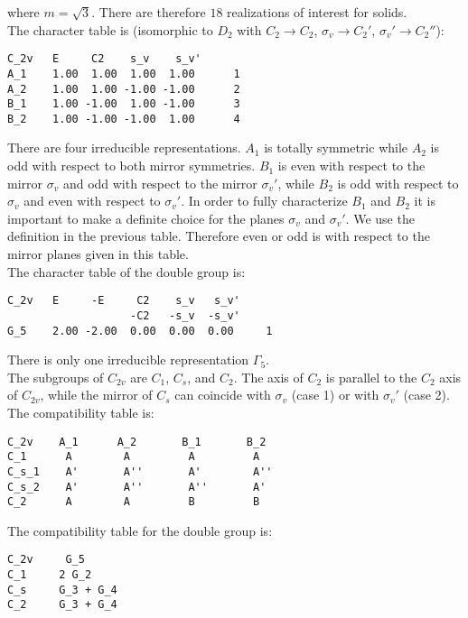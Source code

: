 \documentclass[12pt,a4paper]{article}
\begin{document}
where $m=\sqrt{3}$.
There are therefore $18$ realizations of interest for solids. \\
The character table is (isomorphic to $D_2$ with $C_2 \rightarrow C_2$,
$\sigma_v \rightarrow C_2'$, $\sigma_v' \rightarrow C_2''$):
\begin{verbatim}
C_2v   E     C2    s_v    s_v'
A_1    1.00  1.00  1.00  1.00      1
A_2    1.00  1.00 -1.00 -1.00      2
B_1    1.00 -1.00  1.00 -1.00      3
B_2    1.00 -1.00 -1.00  1.00      4
\end{verbatim}
There are four irreducible representations. $A_1$ is totally symmetric while
$A_2$ is odd with respect to both mirror symmetries.  
$B_1$ is even with respect to the mirror $\sigma_v$ and odd with respect to
the mirror $\sigma_v'$, while $B_2$ is odd with respect to $\sigma_v$ and even 
with respect to $\sigma_v'$. In order to fully characterize $B_1$ and $B_2$
it is important to make a definite choice for the planes $\sigma_v$ and $\sigma_v'$.
We use the definition in the previous table. Therefore even or odd is with respect
to the mirror planes given in this table. \\
The character table of the double group is:
\begin{verbatim}
C_2v   E     -E     C2    s_v   s_v'
                   -C2   -s_v  -s_v'
G_5    2.00 -2.00  0.00  0.00  0.00     1
\end{verbatim}
There is only one irreducible representation $\Gamma_5$. \\
The subgroups of $C_{2v}$ are $C_1$, $C_s$, and $C_2$. The axis of $C_2$ is 
parallel to the $C_2$ axis of $C_{2v}$, while the mirror of $C_s$ can coincide
with $\sigma_v$ (case 1) or with $\sigma_v'$ (case 2). \\
The compatibility table is:
\begin{verbatim}
C_2v    A_1      A_2       B_1       B_2
C_1      A        A         A         A
C_s_1    A'       A''       A'        A''
C_s_2    A'       A''       A''       A'
C_2      A        A         B         B
\end{verbatim}
The compatibility table for the double group is:
\begin{verbatim}
C_2v     G_5
C_1     2 G_2
C_s     G_3 + G_4
C_2     G_3 + G_4
\end{verbatim}

\newpage
\end{document}
